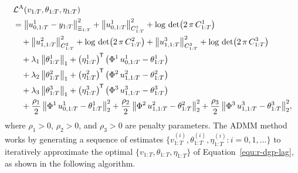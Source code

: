 \begin{align}
	&\mathcal{L}^\mathrm{A}(v_{1:T}, \theta_{1:T}, \eta_{1:T}) \nonumber\\
	&= \big \lVert u^1_{0, 1:T} - y_{1:T} \big \rVert^2_{\Xi_{1:T}} + \big \lVert u^1_{0, 1:T} \big \rVert^2_{C^1_{1:T}} + \log \,\det\bigl(2 \, \pi \, C^1_{1:T}\bigr) \nonumber\\
	&\quad+ \big \lVert u^2_{1, 1:T} \big \rVert^2_{C^2_{1:T}} + \log \,\det\bigl(2 \, \pi \, C^2_{1:T}\bigr) + \big \lVert u^3_{1, 1:T} \big \rVert^2_{C^3_{1:T}} + \log \,\det\bigl(2 \, \pi \, C^3_{1:T}\bigr) \nonumber\\
	&\quad+ \lambda_1  \, \big \lVert \theta^1_{1:T} \big \rVert_1 + \big(\eta^1_{1:T}\big)^{\mkern-1.5mu\mathsf{T}} \, \big(\Phi^1 \, u^1_{0,1:T} - \theta^1_{1:T}\big) \label{equ:r-dgp-lag}\\
	&\quad+ \lambda_2  \, \big \lVert \theta^2_{1:T} \big \rVert_1 + \big(\eta^2_{1:T}\big)^{\mkern-1.5mu\mathsf{T}} \, \big(\Phi^2 \, u^2_{1,1:T} - \theta^2_{1:T}\big) \nonumber\\
	&\quad+ \lambda_3  \, \big \lVert \theta^3_{1:T} \big \rVert_1 + \big(\eta^3_{1:T}\big)^{\mkern-1.5mu\mathsf{T}} \, \big(\Phi^3 \, u^3_{1,1:T} - \theta^3_{1:T}\big) \nonumber\\
	&\quad+ \frac{\rho_1}{2} \,  \big \lVert \Phi^1 \, u^1_{0,1:T} - \theta^1_{1:T} \big \rVert^2_2 + \frac{\rho_2}{2} \,  \big \lVert \Phi^2 \, u^2_{1,1:T} - \theta^2_{1:T} \big \rVert^2_2 + \frac{\rho_3}{2} \,  \big \lVert \Phi^3 \, u^3_{1,1:T} - \theta^3_{1:T} \big \rVert^2_2,\nonumber
\end{align}
%
where $\rho_1>0$, $\rho_2>0$, and $\rho_3>0$ are penalty parameters. The ADMM method works by generating a sequence of estimates $\big\lbrace v^{(i)}_{1:T}, \theta^{(i)}_{1:T}, \eta^{(i)}_{1:T} \colon i=0,1,\ldots\big\rbrace$ to iteratively approximate the optimal $\lbrace v_{1:T}, \theta_{1:T}, \eta_{1:T}\rbrace$ of Equation~\eqref{equ:r-dgp-lag}, as shown in the following algorithm.

